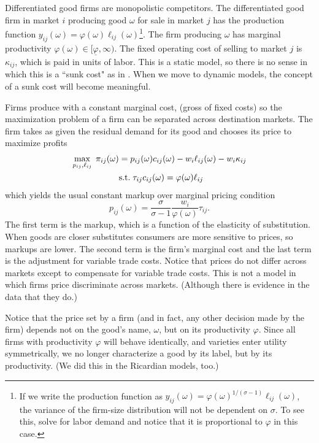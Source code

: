 \documentclass[11pt, pdftex]{article}
\begin{document}
Differentiated good firms are monopolistic competitors.  The differentiated good firm in market $i$ producing good $\omega$ for sale in market $j$ has the production function $y_{ij}(\omega)=\varphi(\omega)\ell_{ij}(\omega)$\footnote{If we write the production function as $y_{ij}(\omega)=\varphi(\omega)^{1/(\sigma-1)}\ell_{ij}(\omega)$, the variance of the firm-size distribution will not be dependent on $\sigma$. To see this, solve for labor demand and notice that it is proportional to $\varphi$ in this case.}.  The firm producing $\omega$ has marginal productivity $\varphi(\omega) \in [\underline{\varphi},\infty).$ The fixed operating cost of selling to market $j$ is $\kappa_{ij}$, which is paid in units of labor.  This is a static model, so there is no sense in which this is a ``sunk cost" as in \citet{robertsTybout97}.  When we move to dynamic models, the concept of a sunk cost will become meaningful.

Firms produce with a constant marginal cost, (gross of fixed costs) so the maximization problem of a firm can be separated across destination markets.  The firm takes as given the residual demand for its good and chooses its price to maximize profits
\begin{align}
  \max_{p_{ij},\ell_{ij}} \; \pi_{ij}(\omega) & = p_{ij}(\omega)c_{ij}(\omega)-w_i\ell_{ij}(\omega)-w_i\kappa_{ij}\\
  & \text{s.t.} \; \tau_{ij}c_{ij}(\omega)=\varphi(\omega)\ell_{ij} \notag
\end{align}
which yields the usual constant markup over marginal pricing condition
\begin{equation}\label{eq:price}
    p_{ij}(\omega)=\frac{\sigma}{\sigma-1}\frac{w_i}{\varphi(\omega)}\tau_{ij}.
\end{equation}
The first term is the markup, which is a function of the elasticity of substitution.  When goods are closer substitutes consumers are more sensitive to prices, so markups are lower.  The second term is the firm's marginal cost and the last term is the adjustment for variable trade costs.  Notice that prices do not differ across markets except to compensate for variable trade costs. This is not a model in which firms price discriminate across markets. (Although there is evidence in the data that they do.)

Notice that the price set by a firm (and in fact, any other decision made by the firm) depends not on the good's name,  $\omega$, but on its productivity  $\varphi$.  Since all firms with productivity $\varphi$  will behave identically, and varieties enter utility symmetrically, we no longer characterize a good by its label, but by its productivity. (We did this in the Ricardian models, too.)
\end{document}
